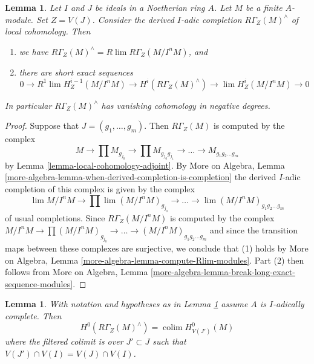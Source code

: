 \documentclass{stacks-project}
\theoremstyle{plain}
\newtheorem{lemma}[subsection]{Lemma}
\theoremstyle{definition}
\theoremstyle{remark}
\numberwithin{equation}{subsection}
\def\lim{\mathop{\mathrm{lim}}\nolimits}
\def\colim{\mathop{\mathrm{colim}}\nolimits}
\begin{document}
\begin{lemma}
\label{lemma-completion-local}
Let $I$ and $J$ be ideals in a Noetherian ring $A$. Let $M$ be a finite
$A$-module. Set $Z =V(J)$. Consider the derived $I$-adic completion
$R\Gamma_Z(M)^\wedge$ of local cohomology. Then
\begin{enumerate}
\item we have $R\Gamma_Z(M)^\wedge = R\lim R\Gamma_Z(M/I^nM)$, and
\item there are short exact sequences
$$
0 \to R^1\lim H^{i - 1}_Z(M/I^nM) \to H^i(R\Gamma_Z(M)^\wedge) \to
\lim H^i_Z(M/I^nM) \to 0
$$
\end{enumerate}
In particular $R\Gamma_Z(M)^\wedge$ has vanishing cohomology
in negative degrees.
\end{lemma}

\begin{proof}
Suppose that $J = (g_1, \ldots, g_m)$.
Then $R\Gamma_Z(M)$ is computed by the complex
$$
M \to \prod M_{g_{j_0}} \to \prod M_{g_{j_0}g_{j_1}} \to
\ldots \to M_{g_1g_2\ldots g_m}
$$
by Lemma \ref{lemma-local-cohomology-adjoint}.
By More on Algebra, Lemma
\ref{more-algebra-lemma-when-derived-completion-is-completion}
the derived $I$-adic completion of
this complex is given by the complex
$$
\lim M/I^nM \to \prod \lim (M/I^nM)_{g_{j_0}} \to
\ldots \to \lim (M/I^nM)_{g_1g_2\ldots g_m}
$$
of usual completions. Since $R\Gamma_Z(M/I^nM)$ is computed by
the complex $ M/I^nM \to \prod (M/I^nM)_{g_{j_0}} \to
\ldots \to (M/I^nM)_{g_1g_2\ldots g_m}$ and since the
transition maps between these complexes are surjective,
we conclude that (1) holds by
More on Algebra, Lemma \ref{more-algebra-lemma-compute-Rlim-modules}.
Part (2) then follows from More on Algebra, Lemma
\ref{more-algebra-lemma-break-long-exact-sequence-modules}.
\end{proof}

\begin{lemma}
\label{lemma-completion-local-H0}
With notation and hypotheses as in Lemma \ref{lemma-completion-local}
assume $A$ is $I$-adically complete. Then
$$
H^0(R\Gamma_Z(M)^\wedge) = \colim H^0_{V(J')}(M)
$$
where the filtered colimit is over $J' \subset J$ such that
$V(J') \cap V(I) = V(J) \cap V(I)$.
\end{lemma}
\end{document}
